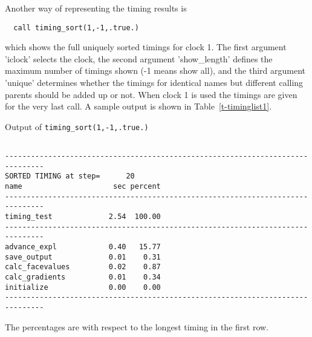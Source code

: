 \documentclass[10pt]{article}
\begin{document}
Another way of representing the timing results is
\begin{verbatim}
  call timing_sort(1,-1,.true.)
\end{verbatim}
which shows the full uniquely sorted timings for clock 1. 
The first argument 'iclock' selects the clock, the second argument 
'show\_length' defines the maximum number of timings shown 
(-1 means show all), 
and the third argument 'unique' determines whether
the timings for identical names but different calling parents
should be added up or not. 
When clock 1 is used the timings are given for the very last call.
A sample output is shown in Table~\ref{t-timinglist1}.
\begin{table}
\caption{Output of {\tt timing\_sort(1,-1,.true.)}}
{\footnotesize
\begin{verbatim}

-------------------------------------------------------------------------------
SORTED TIMING at step=      20
name                     sec percent
-------------------------------------------------------------------------------
timing_test             2.54  100.00
-------------------------------------------------------------------------------
advance_expl            0.40   15.77
save_output             0.01    0.31
calc_facevalues         0.02    0.87
calc_gradients          0.01    0.34
initialize              0.00    0.00
-------------------------------------------------------------------------------

\end{verbatim}
}
\label{t-timinglist1}
\end{table}
The percentages are with respect to the longest timing in the first row.
\end{document}
